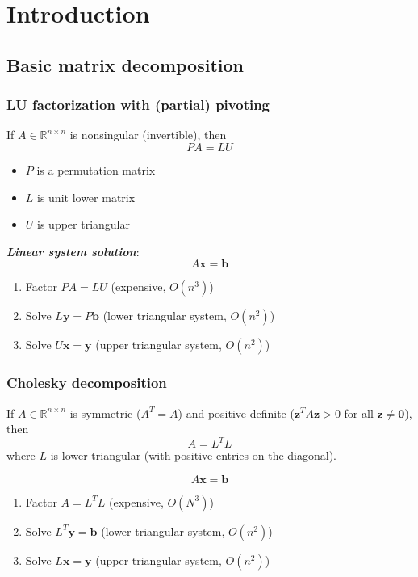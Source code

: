 \section{Introduction}

\subsection{Basic matrix decomposition}

\subsubsection{LU factorization with (partial) pivoting}

If $A \in \mathbb{R}^{n\times n}$ is nonsingular (invertible), then
$$
    PA = LU
$$

\begin{itemize}
    \item $P$ is a permutation matrix
    \item $L$ is unit lower matrix
    \item $U$ is upper triangular
\end{itemize}


\textbf{\textit{Linear system solution}}:
$$
    A \mathbf{x} = \mathbf{b}
$$
\begin{enumerate}
    \item Factor $PA = LU$ (expensive, $O(n^{3})$)
    \item Solve $L\mathbf{y} = P \mathbf{b}$ (lower triangular system, $O(n^{2})$)
    \item Solve $U\mathbf{x} = \mathbf{y}$ (upper triangular system, $O(n^{2})$)
\end{enumerate}

\subsubsection{Cholesky decomposition}

If $A \in \mathbb{R}^{n \times n}$ is symmetric ($A^{T} = A$) and positive definite ($\mathbf{z}^{T}A \mathbf{z} > 0$ for all $\mathbf{z} \neq \mathbf{0}$), then
$$
    A = L^{T}L
$$
where $L$ is lower triangular (with positive entries on the diagonal).

\begin{tcolorbox}[title=Linear system solution]
    $$A \mathbf{x} = \mathbf{b}$$
    \begin{enumerate}
        \item Factor $A = L^{T} L$ (expensive, $O(N^{3})$)
        \item Solve $L^{T}\mathbf{y} = \mathbf{b}$ (lower triangular system, $O(n^{2})$)
        \item Solve $L \mathbf{x} = \mathbf{y}$ (upper triangular system, $O(n^{2})$)
    \end{enumerate}
\end{tcolorbox}

